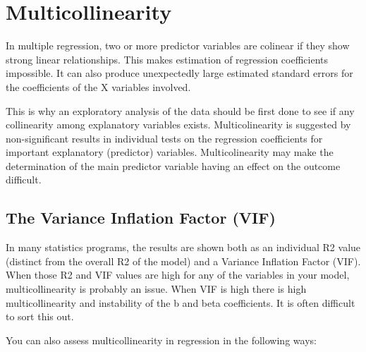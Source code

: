 \documentclass[a4paper,12pt]{article}
\begin{document}
\newpage
\section{Multicollinearity}
In multiple regression, two or more predictor variables are colinear if they show strong linear relationships. This makes estimation of regression coefficients impossible. It can also produce unexpectedly large estimated standard errors for the coefficients of the X variables involved.

This is why an exploratory analysis of the data should be first done to see if any collinearity among explanatory variables exists. Multicolinearity is suggested by non-significant results in individual tests on the regression coefficients for important explanatory (predictor) variables. Multicolinearity may make the determination of the main predictor variable having an effect on the outcome difficult.







\subsection{The Variance Inflation Factor (VIF)}



   In many statistics programs, the results are shown both as an individual R2 value (distinct from the overall R2 of the model) and a Variance Inflation Factor (VIF). When those R2 and VIF values are high for any of the variables in your model, multicollinearity is probably an issue. When VIF is high there is high multicollinearity and instability of the b and beta coefficients. It is often difficult to sort this out. \\

\bigskip

You can also assess multicollinearity in regression in the following ways:
\end{document}

